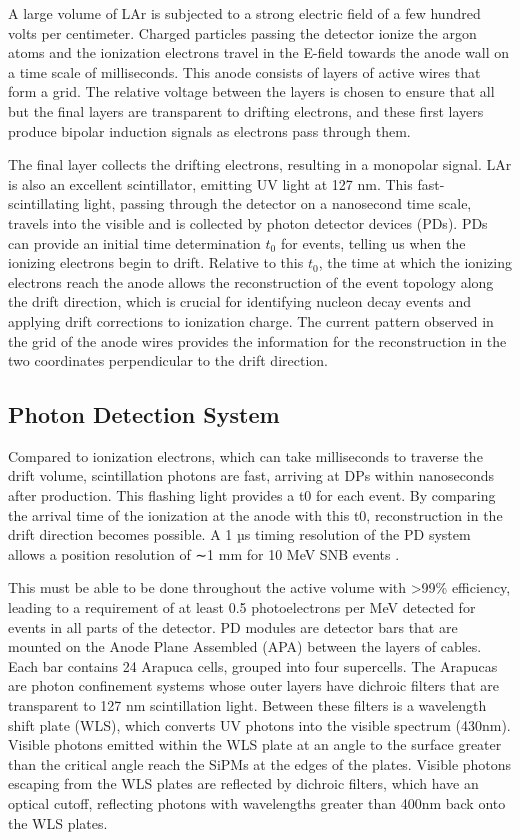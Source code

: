 \documentclass[a4paper,10pt,epsfig,epsf,amsfonts,amsmath]{article}
\begin{document}
A large volume of LAr is subjected to a strong electric field of a few hundred volts per centimeter. Charged particles passing the detector ionize the argon atoms and the ionization electrons travel in the E-field towards the anode wall on a time scale of milliseconds. This anode consists of layers of active wires that form a grid. The relative voltage between the layers is chosen to ensure that all but the final layers are transparent to drifting electrons, and these first layers produce bipolar induction signals as electrons pass through them.

The final layer collects the drifting electrons, resulting in a monopolar signal. LAr is also an excellent scintillator, emitting UV light at 127 nm. This fast-scintillating light, passing through the detector on a nanosecond time scale, travels into the visible and is collected by photon detector devices (PDs). PDs can provide an initial time determination $t_0$ for events, telling us when the ionizing electrons begin to drift. Relative to this $t_0$, the time at which the ionizing electrons reach the anode allows the reconstruction of the event topology along the drift direction, which is crucial for identifying nucleon decay events and applying drift corrections to ionization charge. The current pattern observed in the grid of the anode wires provides the information for the reconstruction in the two coordinates perpendicular to the drift direction.


\subsection{Photon Detection System}

Compared to ionization electrons, which can take milliseconds to traverse the drift volume, scintillation photons are fast, arriving at DPs within nanoseconds after production. This flashing light provides a t0 for each event. By comparing the arrival time of the ionization at the anode with this t0, reconstruction in the drift direction becomes possible. A 1 µs timing resolution of the PD system allows a position resolution of ∼1 mm for 10 MeV SNB events \cite{Abi_2020_2}.

This must be able to be done throughout the active volume with >99\% efficiency, leading to a requirement of at least 0.5 photoelectrons per MeV detected for events in all parts of the detector. PD modules are detector bars that are mounted on the Anode Plane Assembled (APA) between the layers of cables. Each bar contains 24 Arapuca cells, grouped into four supercells. The Arapucas are photon confinement systems whose outer layers have dichroic filters that are transparent to 127 nm scintillation light. Between these filters is a wavelength shift plate (WLS), which converts UV photons into the visible spectrum (430nm). Visible photons emitted within the WLS plate at an angle to the surface greater than the critical angle reach the SiPMs at the edges of the plates. Visible photons escaping from the WLS plates are reflected by dichroic filters, which have an optical cutoff, reflecting photons with wavelengths greater than 400nm back onto the WLS plates.
\end{document}
